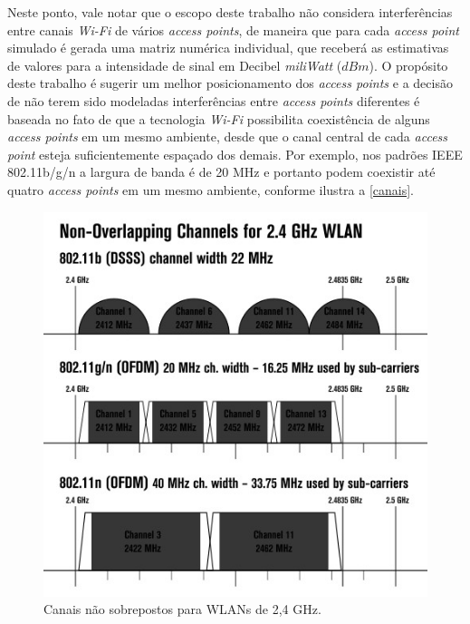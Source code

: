 \documentclass[
	12pt,				%
	twoside,			%
	a4paper,			%
	english,			%
	french,				%
	spanish,			%
	brazil				%
	]{abntex2}
\begin{document}
Neste ponto, vale notar que o escopo deste trabalho não considera
interferências entre canais \emph{Wi-Fi} de vários \emph{access points},
de maneira que para cada \emph{access point} simulado é gerada uma
matriz numérica individual, que receberá as estimativas de valores para
a intensidade de sinal em Decibel \emph{miliWatt} (\(dBm\)). O propósito
deste trabalho é sugerir um melhor posicionamento dos \emph{access
points} e a decisão de não terem sido modeladas interferências entre
\emph{access points} diferentes é baseada no fato de que a tecnologia
\emph{Wi-Fi} possibilita coexistência de alguns \emph{access points} em
um mesmo ambiente, desde que o canal central de cada \emph{access point}
esteja suficientemente espaçado dos demais. Por exemplo, nos padrões
IEEE 802.11b/g/n a largura de banda é de 20 MHz e portanto podem
coexistir até quatro \emph{access points} em um mesmo ambiente, conforme
ilustra a \autoref{canais}.

\begin{figure}[htb]
    \caption{\label{canais} Canais não sobrepostos para WLANs de 2,4 GHz.}
    \begin{center}
        \includegraphics[scale=0.6]{imagens/canais-1.jpg}
    \end{center}
\end{figure}
\end{document}
